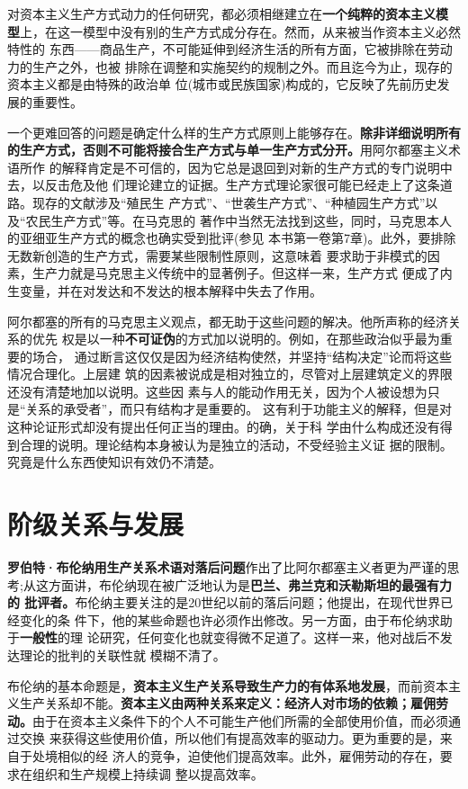 对资本主义生产方式动力的任何研究，都必须相继建立在\textbf{一个纯粹的资本主义模
  型}上，在这一模型中没有别的生产方式成分存在。然而，从来被当作资本主义必然特性的
东西——商品生产，不可能延伸到经济生活的所有方面，它被排除在劳动力的生产之外，也被
排除在调整和实施契约的规制之外。而且迄今为止，现存的资本主义都是由特殊的政治单
位(城市或民族国家)构成的，它反映了先前历史发展的重要性。

一个更难回答的问题是确定什么样的生产方式原则上能够存在。\textbf{除非详细说明所有
  的生产方式，否则不可能将接合生产方式与单一生产方式分开。}用阿尔都塞主义术语所作
的解释肯定是不可信的，因为它总是退回到对新的生产方式的专门说明中去，以反击危及他
们理论建立的证据。生产方式理论家很可能已经走上了这条道路。现存的文献涉及“殖民生
产方式”、“世袭生产方式”、“种植园生产方式”以及“农民生产方式”等。在马克思的
著作中当然无法找到这些，同时，马克思本人的亚细亚生产方式的概念也确实受到批评(参见
本书第一卷第7章)。此外，要排除无数新创造的生产方式，需要某些限制性原则，这意味着
要求助于非模式的因素，生产力就是马克思主义传统中的显著例子。但这样一来，生产方式
便成了内生变量，并在对发达和不发达的根本解释中失去了作用。

阿尔都塞的所有的马克思主义观点，都无助于这些问题的解决。他所声称的经济关系的优先
权是以一种\textbf{不可证伪}的方式加以说明的。例如，在那些政治似乎最为重要的场合，
通过断言这仅仅是因为经济结构使然，并坚持“结构决定”论而将这些情况合理化。上层建
筑的因素被说成是相对独立的，尽管对上层建筑定义的界限还没有清楚地加以说明。这些因
素与人的能动作用无关，因为个人被设想为只是“关系的承受者”，而只有结构才是重要的。
这有利于功能主义的解释，但是对这种论证形式却没有提出任何正当的理由。的确，关于科
学由什么构成还没有得到合理的说明。理论结构本身被认为是独立的活动，不受经验主义证
据的限制。究竟是什么东西使知识有效仍不清楚。
\vfill
\section{阶级关系与发展}

\textbf{罗伯特·布伦纳用生产关系术语对落后问题}作出了比阿尔都塞主义者更为严谨的思
考;从这方面讲，布伦纳现在被广泛地认为是\textbf{巴兰、弗兰克和沃勒斯坦的最强有力的
  批评者。}布伦纳主要关注的是20世纪以前的落后问题；他提出，在现代世界已经变化的条
件下，他的某些命题也许必须作出修改。另一方面，由于布伦纳求助于\textbf{一般性}的理
论研究，任何变化也就变得微不足道了。这样一来，他对战后不发达理论的批判的关联性就
模糊不清了。

布伦纳的基本命题是，\textbf{资本主义生产关系导致生产力的有体系地发展}，而前资本主
义生产关系却不能。\textbf{资本主义由两种关系来定义：经济人对市场的依赖；雇佣劳
  动。}由于在资本主义条件下的个人不可能生产他们所需的全部使用价值，而必须通过交换
来获得这些使用价值，所以他们有提高效率的驱动力。更为重要的是，来自于处境相似的经
济人的竞争，迫使他们提高效率。此外，雇佣劳动的存在，要求在组织和生产规模上持续调
整以提高效率。

